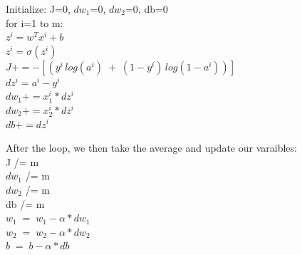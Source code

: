 \documentclass[11pt, a4paper]{article}
\begin{document}
\begin{spacing}{1.1}
\begin{minipage}[c]{8cm}
	Initialize: J=0, $dw_1$=0, $dw_2$=0, db=0 \\
	for i=1 to m: \\
	\hspace*{2mm} $z^i = w^Tx^i+b$\\
	\hspace*{2mm} $z^i = \sigma(z^i)$\\
	\hspace*{2mm} $J+= -[(y^i\,log(a^i) \; + \; (1-y^i)\,log(1-a^i))]$\\
	\hspace*{2mm} $dz^i = a^i - y^i$\\
	\hspace*{2mm} $dw_1 += x_1^i*dz^i$\\
	\hspace*{2mm} $dw_2 += x_2^i*dz^i$\\
	\hspace*{2mm} $db += dz^i$
	\end{minipage}
	\begin{minipage}[c]{8cm}
	\vspace*{2mm}
	After the loop, we then take the average and update our varaibles: \vspace*{1mm} \\
	J /= m \\
	$dw_1$ /= m \\
	$dw_2$ /= m \\
	db /= m \vspace*{1mm} \\
	$w_1 \; = \; w_1 - \alpha* dw_1$ \\
	$w_2 \; = \; w_2 - \alpha* dw_2$\\
	 $b \; = \; b - \alpha* db$
	\end{minipage} \newpage


\end{spacing}
\end{document}
